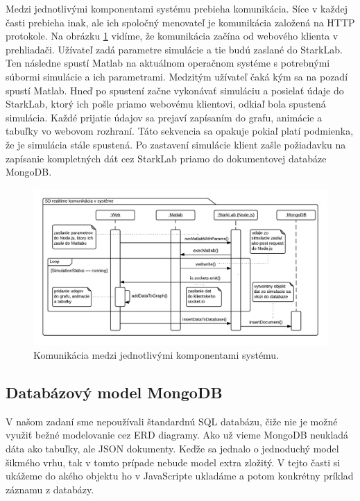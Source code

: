 Medzi jednotlivými komponentami systému prebieha komunikácia. Síce v každej časti prebieha inak, ale ich spoločný menovateľ je komunikácia založená na HTTP protokole. Na obrázku \ref{img-sequence-realtime} vidíme, že komunikácia začína od webového klienta v prehliadači. Užívateľ zadá parametre simulácie a tie budú zaslané do StarkLab. Ten následne spustí Matlab na aktuálnom operačnom systéme s potrebnými súbormi simulácie a ich parametrami. Medzitým užívateľ čaká kým sa na pozadí spustí Matlab. Hneď po spustení začne vykonávať simuláciu a posielať údaje do StarkLab, ktorý ich pošle priamo webovému klientovi, odkiaľ bola spustená simulácia. Každé prijatie údajov sa prejaví zapísaním do grafu, animácie a tabuľky vo webovom rozhraní. Táto sekvencia sa opakuje pokiaľ platí podmienka, že je simulácia stále spustená. Po zastavení simulácie klient zašle požiadavku na zapísanie kompletných dát cez StarkLab priamo do dokumentovej databáze MongoDB.

\begin{figure}[H]
  \centering
  \includegraphics[scale=0.38]{img/diagrams/sequence-realtime-communication.png}
  \caption{Komunikácia medzi jednotlivými komponentami systému.}
  \label{img-sequence-realtime}
\end{figure}

\subsection{Databázový model MongoDB}
V našom zadaní sme nepoužívali štandardnú SQL databázu, čiže nie je možné využiť bežné modelovanie cez ERD diagramy. Ako už vieme MongoDB neukladá dáta ako tabuľky, ale JSON dokumenty. Keďže sa jednalo o jednoduchý model šikmého vrhu, tak v tomto prípade nebude model extra zložitý. V tejto časti si ukážeme do akého objektu ho v JavaScripte ukladáme a potom konkrétny príklad záznamu z databázy.

